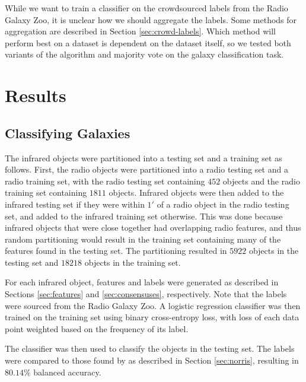   While we want to train a classifier on the crowdsourced labels from the Radio Galaxy Zoo, it is unclear how we should aggregate the labels. Some methods for aggregation are described in Section \ref{sec:crowd-labels}. Which method will perform best on a dataset is dependent on the dataset itself, so we tested both variants of the \citeauthor{raykar10} algorithm and majority vote on the galaxy classification task.


\section{Results}
\label{sec:rgz-results}
  
  \subsection{Classifying Galaxies}


    The infrared objects were partitioned into a testing set and a training set as follows. First, the radio objects were partitioned into a radio testing set and a radio training set, with the radio testing set containing $452$ objects and the radio training set containing $1811$ objects. Infrared objects were then added to the infrared testing set if they were within $1'$ of a radio object in the radio testing set, and added to the infrared training set otherwise. This was done because infrared objects that were close together had overlapping radio features, and thus random partitioning would result in the training set containing many of the features found in the testing set. The partitioning resulted in $5922$ objects in the testing set and $18218$ objects in the training set.

    For each infrared object, features and labels were generated as described in Sections \ref{sec:features} and \ref{sec:consensuses}, respectively. Note that the labels were sourced from the Radio Galaxy Zoo. A logistic regression classifier was then trained on the training set using binary cross-entropy loss, with loss of each data point weighted based on the frequency of its label.

    The classifier was then used to classify the objects in the testing set. The labels were compared to those found by \citet{norris06} as described in Section \ref{sec:norris}, resulting in $80.14\%$ balanced accuracy.

